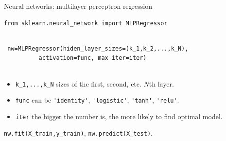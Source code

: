 \documentclass{beamer}
\begin{document}
%
%

















\begin{frame}[fragile]{Neural networks: multilayer perceptron regression}

 \lstinline$from sklearn.neural_network import MLPRegressor$


 \begin{lstlisting}

 nw=MLPRegressor(hiden_layer_sizes=(k_1,k_2,...,k_N), 
          activation=func, max_iter=iter)


 \end{lstlisting}


 \bigskip

 \begin{itemize}
 \item \lstinline$k_1,...,k_N$ sizes of the first, second, etc. $N$th layer.

 \medskip

 \item \lstinline$func$ can be \lstinline$'identity'$, \lstinline$'logistic'$,  \lstinline$'tanh'$, \lstinline$'relu'$.
 
 \medskip

  \item \lstinline$iter$ the bigger the number is, the more likely to find optimal model.

  
 \end{itemize}


 \lstinline$nw.fit(X_train,y_train)$, \lstinline$nw.predict(X_test)$. 

 



\end{frame}
\end{document}
